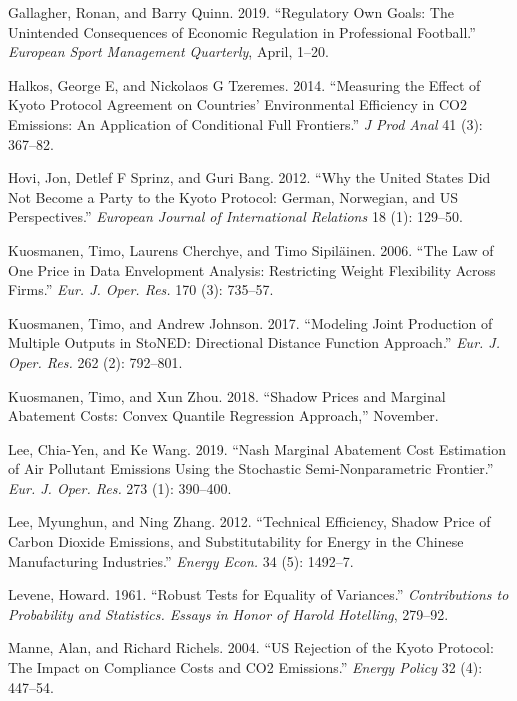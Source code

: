\documentclass[
  10pt,
]{article}
\begin{document}
\leavevmode\hypertarget{ref-Gallagher2019}{}%
Gallagher, Ronan, and Barry Quinn. 2019. ``Regulatory Own Goals: The
Unintended Consequences of Economic Regulation in Professional
Football.'' \emph{European Sport Management Quarterly}, April, 1--20.

\leavevmode\hypertarget{ref-Halkos2014}{}%
Halkos, George E, and Nickolaos G Tzeremes. 2014. ``Measuring the Effect
of Kyoto Protocol Agreement on Countries' Environmental Efficiency in
CO2 Emissions: An Application of Conditional Full Frontiers.'' \emph{J
Prod Anal} 41 (3): 367--82.

\leavevmode\hypertarget{ref-Hovi2012}{}%
Hovi, Jon, Detlef F Sprinz, and Guri Bang. 2012. ``Why the United States
Did Not Become a Party to the Kyoto Protocol: German, Norwegian, and US
Perspectives.'' \emph{European Journal of International Relations} 18
(1): 129--50.

\leavevmode\hypertarget{ref-Kuosmanen2006}{}%
Kuosmanen, Timo, Laurens Cherchye, and Timo Sipiläinen. 2006. ``The Law
of One Price in Data Envelopment Analysis: Restricting Weight
Flexibility Across Firms.'' \emph{Eur. J. Oper. Res.} 170 (3): 735--57.

\leavevmode\hypertarget{ref-Kuosmanen2017}{}%
Kuosmanen, Timo, and Andrew Johnson. 2017. ``Modeling Joint Production
of Multiple Outputs in StoNED: Directional Distance Function Approach.''
\emph{Eur. J. Oper. Res.} 262 (2): 792--801.

\leavevmode\hypertarget{ref-Kuosmanen2018b}{}%
Kuosmanen, Timo, and Xun Zhou. 2018. ``Shadow Prices and Marginal
Abatement Costs: Convex Quantile Regression Approach,'' November.

\leavevmode\hypertarget{ref-Lee2019}{}%
Lee, Chia-Yen, and Ke Wang. 2019. ``Nash Marginal Abatement Cost
Estimation of Air Pollutant Emissions Using the Stochastic
Semi-Nonparametric Frontier.'' \emph{Eur. J. Oper. Res.} 273 (1):
390--400.

\leavevmode\hypertarget{ref-Lee2012}{}%
Lee, Myunghun, and Ning Zhang. 2012. ``Technical Efficiency, Shadow
Price of Carbon Dioxide Emissions, and Substitutability for Energy in
the Chinese Manufacturing Industries.'' \emph{Energy Econ.} 34 (5):
1492--7.

\leavevmode\hypertarget{ref-Levene1961}{}%
Levene, Howard. 1961. ``Robust Tests for Equality of Variances.''
\emph{Contributions to Probability and Statistics. Essays in Honor of
Harold Hotelling}, 279--92.

\leavevmode\hypertarget{ref-Manne2004}{}%
Manne, Alan, and Richard Richels. 2004. ``US Rejection of the Kyoto
Protocol: The Impact on Compliance Costs and CO2 Emissions.''
\emph{Energy Policy} 32 (4): 447--54.
\end{document}
